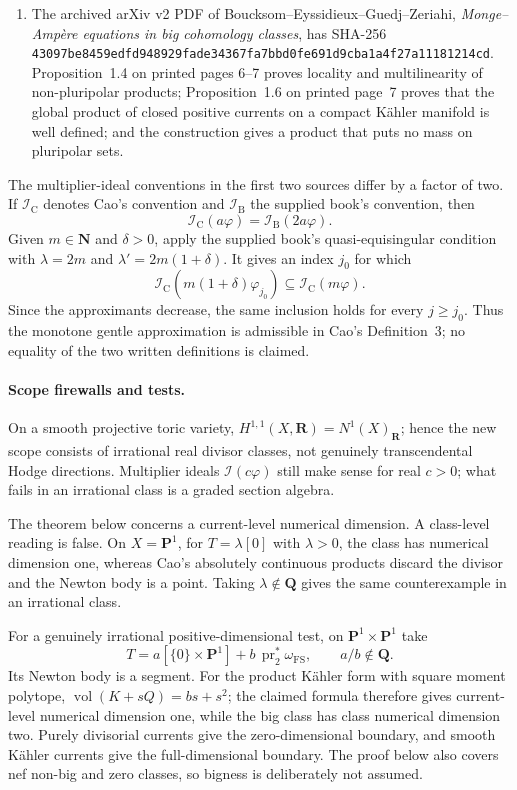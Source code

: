 \begin{enumerate}
\item The archived arXiv v2 PDF of
Boucksom--Eyssidieux--Guedj--Zeriahi,
\emph{Monge--Amp\`ere equations in big cohomology classes}, has SHA-256
\texttt{43097be8459edfd948929fade34367fa7bbd0fe691d9cba1a4f27a11181214cd}.
Proposition~1.4 on printed pages 6--7 proves locality and multilinearity of
non-pluripolar products; Proposition~1.6 on printed page~7 proves that the
global product of closed positive currents on a compact K\"ahler manifold
is well defined; and the construction gives a product that puts no mass on
pluripolar sets.
\end{enumerate}

The multiplier-ideal conventions in the first two sources differ by a factor
of two.  If \(\mathcal I_{\mathrm C}\) denotes Cao's convention and
\(\mathcal I_{\mathrm B}\) the supplied book's convention, then
\[
                  \mathcal I_{\mathrm C}(a\varphi)
                  =\mathcal I_{\mathrm B}(2a\varphi).
\]
Given \(m\in\mathbf N\) and \(\delta>0\), apply the supplied book's
quasi-equisingular condition with
\(\lambda=2m\) and \(\lambda'=2m(1+\delta)\).  It gives an index \(j_0\)
for which
\[
 \mathcal I_{\mathrm C}(m(1+\delta)\varphi_{j_0})
 \subseteq\mathcal I_{\mathrm C}(m\varphi).
\]
Since the approximants decrease, the same inclusion holds for every
\(j\geq j_0\).  Thus the monotone gentle approximation is admissible in
Cao's Definition~3; no equality of the two written definitions is claimed.

\paragraph{Scope firewalls and tests.}
On a smooth projective toric variety,
\(H^{1,1}(X,\mathbf R)=N^1(X)_{\mathbf R}\); hence the new scope consists of
irrational real divisor classes, not genuinely transcendental Hodge
directions.  Multiplier ideals \(\mathcal I(c\varphi)\) still make sense for
real \(c>0\); what fails in an irrational class is a graded section algebra.

The theorem below concerns a current-level numerical dimension.  A
class-level reading is false.  On \(X=\mathbf P^1\), for
\(T=\lambda[0]\) with \(\lambda>0\), the class has numerical dimension one,
whereas Cao's absolutely continuous products discard the divisor and the
Newton body is a point.  Taking \(\lambda\notin\mathbf Q\) gives the same
counterexample in an irrational class.

For a genuinely irrational positive-dimensional test, on
\(\mathbf P^1\times\mathbf P^1\) take
\[
 T=a[\{0\}\times\mathbf P^1]
     +b\,\operatorname{pr}_2^*\omega_{\mathrm{FS}},
 \qquad a/b\notin\mathbf Q.
\]
Its Newton body is a segment.  For the product K\"ahler form with square
moment polytope, \(\operatorname{vol}(K+sQ)=bs+s^2\); the claimed formula
therefore gives current-level numerical dimension one, while the big class
has class numerical dimension two.  Purely divisorial currents give the
zero-dimensional boundary, and smooth K\"ahler currents give the
full-dimensional boundary.  The proof below also covers nef non-big and zero
classes, so bigness is deliberately not assumed.

